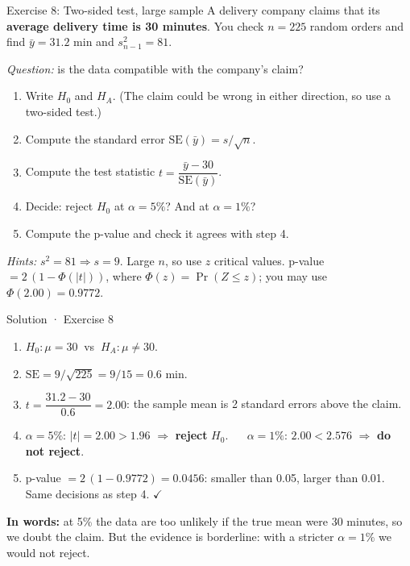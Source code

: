 \documentclass[
  11pt,
  ignorenonframetext,
  aspectratio=169,
]{beamer}
\providecommand{\tightlist}{%
  \setlength{\itemsep}{0pt}\setlength{\parskip}{0pt}}
\newcommand{\se}{\mathrm{SE}}
\begin{document}
\begin{frame}{Exercise 8: Two-sided test, large sample}
\protect{}\label{exercise-8-two-sided-test-large-sample}
A delivery company claims that its \textbf{average delivery time is 30
minutes}. You check \(n=225\) random orders and find \(\bar y=31.2\) min
and \(s^2_{n-1}=81\).

\emph{Question:} is the data compatible with the company's claim?

\begin{enumerate}
\tightlist
\item
  Write \(H_0\) and \(H_A\). (The claim could be wrong in either
  direction, so use a two-sided test.)
\item
  Compute the standard error \(\se(\bar y)=s/\sqrt n\).
\item
  Compute the test statistic \(t=\dfrac{\bar y-30}{\se(\bar y)}\).
\item
  Decide: reject \(H_0\) at \(\alpha=5\%\)? And at \(\alpha=1\%\)?
\item
  Compute the p-value and check it agrees with step 4.
\end{enumerate}

\emph{Hints:} \(s^2=81\Rightarrow s=9\). Large \(n\), so use \(z\)
critical values. p-value \(=2\,(1-\Phi(|t|))\), where
\(\Phi(z)=\Pr(Z\le z)\); you may use \(\Phi(2.00)=0.9772\).
\end{frame}

\begin{frame}{Solution · Exercise 8}
\protect{}\label{solution-exercise-8}
\begin{enumerate}
\tightlist
\item
  \(H_0:\mu=30\ \) vs \(\ H_A:\mu\neq30\).
\item
  \(\se=9/\sqrt{225}=9/15=\mathbf{0.6}\) min.
\item
  \(t=\dfrac{31.2-30}{0.6}=\mathbf{2.00}\): the sample mean is 2
  standard errors above the claim.
\item
  \(\alpha=5\%\): \(|t|=2.00>1.96\) \(\Rightarrow\) \textbf{reject}
  \(H_0\). \(\quad\) \(\alpha=1\%\): \(2.00<2.576\) \(\Rightarrow\)
  \textbf{do not reject}.
\item
  p-value \(=2\,(1-0.9772)=\mathbf{0.0456}\): smaller than 0.05, larger
  than 0.01. Same decisions as step 4. \(\checkmark\)
\end{enumerate}

\textbf{In words:} at 5\% the data are too unlikely if the true mean were
30 minutes, so we doubt the claim. But the evidence is borderline: with a
stricter \(\alpha=1\%\) we would not reject.
\end{frame}
\end{document}
